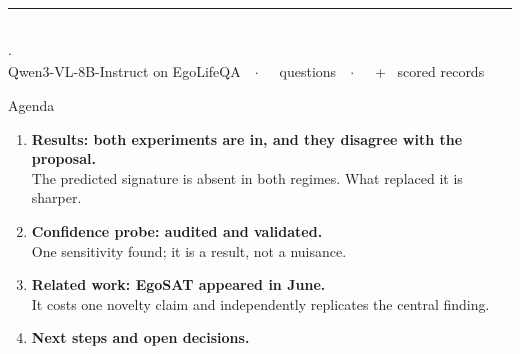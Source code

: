 \begin{frame}
  \vfill
  \begin{center}
    {\Large\bfseries\color{inkdark}\inserttitle}\\[0.7em]
    {\footnotesize\color{inkmid}\insertsubtitle}\\[1.4em]
    {\color{accblue}\rule{4cm}{1.2pt}}\\[1.2em]
    {\small\color{inkmid}\insertauthor \quad$\cdot$\quad \insertdate}\\[0.4em]
    {\scriptsize\color{inklight}Qwen3-VL-8B-Instruct on EgoLifeQA\ \ $\cdot$\ \ \Nquestions\ questions\ \ $\cdot$\ \ \NrecEone\ + \NrecEtwo\ scored records}
  \end{center}
  \vfill
\end{frame}

\begin{frame}[t]{Agenda}
  \begin{enumerate}\setlength\itemsep{0.7em}
    \item \textbf{Results: both experiments are in, and they disagree with the proposal.}\\
      {\footnotesize\color{inkmid} The predicted signature is absent in both regimes. What replaced it is sharper.}
    \item \textbf{Confidence probe: audited and validated.}\\
      {\footnotesize\color{inkmid} One sensitivity found; it is a result, not a nuisance.}
    \item \textbf{Related work: EgoSAT appeared in June.}\\
      {\footnotesize\color{inkmid} It costs one novelty claim and independently replicates the central finding.}
    \item \textbf{Next steps and open decisions.}
  \end{enumerate}
\end{frame}
